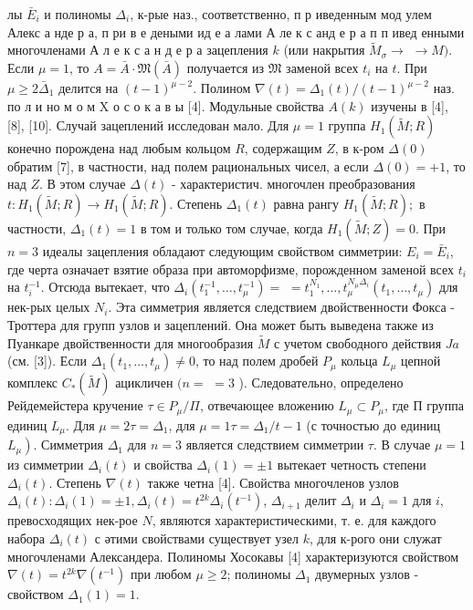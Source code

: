 \documentclass[10pt]{article}
\begin{document}
лы $\bar{E}_{i}$ и полиномы $\Delta_{i}$, к-рые наз., соответственно, п р иведенным мод улем Алекс а нде р а, п ри в е деными ид е а лами А ле к с анд е р а п п ивед енными многочленами А л е к с а н д е р а зацепления $k$ (или накрытия $\tilde{M}_{\sigma} \rightarrow$ $\rightarrow M)$. Если $\mu=1$, то $A=\bar{A} \cdot \mathfrak{M}(\bar{A})$ получается из $\mathfrak{M}$ заменой всех $t_{i}$ на $t$. При $\mu \geqslant 2 \bar{\Delta}_{1}$ делится на $(t-1)^{\mu-2}$. Полином $\nabla(t)=\Delta_{1}(t) /(t-1)^{\mu-2}$ наз. по л и но м о м $\mathrm{X}$ о с о к а в ы [4]. Модульные свойства $A(k)$ изучены в [4], [8], [10]. Случай зацеплений исследован мало. Для $\mu=1$ группа $H_{1}(\tilde{M} ; R)$ конечно порождена над любым кольцом $R$, содержащим $Z$, в к-ром $\Delta(0)$ обратим [7], в частности, над полем рациональных чисел, а если $\Delta(0)=+1$, то над $Z$. В этом случае $\Delta(t)$ - характеристич. многочлен преобразования $t: H_{1}(\tilde{M} ; R) \rightarrow H_{1}(\tilde{M} ; R)$. Степень $\Delta_{1}(t)$ равна рангу $H_{1}(\tilde{M} ; R) ;$ в частности, $\Delta_{1}(t)=1$ в том и только том случае, когда $H_{1}(\tilde{M} ; Z)=0$. При $n=3$ идеалы зацепления обладают следующим свойством симметрии: $E_{i}=\bar{E}_{i}$, где черта означает взятие образа при автоморфизме, порожденном заменой всех $t_{i}$ на $t_{i}^{-1}$. Отсюда вытекает, что $\Delta_{i}\left(t_{1}^{-1}, \ldots, t_{\mu}^{-1}\right)=$ $=t_{1}^{N_{1}}, \ldots, t_{\mu}^{N_{\mu} \Delta_{i}}\left(t_{1}, \ldots, t_{\mu}\right)$ для нек-рых целых $N_{i}$. Эта симметрия является следствием двойственности Фокса - Троттера для групп узлов и зацеплений. Она может быть выведена также из Пуанкаре двойственности для многообразия $\tilde{M}$ с учетом свободного действия $J a$ (см. [3]). Если $\Delta_{1}\left(t_{1}, \ldots, t_{\mu}\right) \neq 0$, то над полем дробей $P_{\mu}$ кольца $L_{\mu}$ цепной комплекс $C_{*}(\tilde{M})$ ацикличен $(n=$ $=3$ ). Следовательно, определено Рейдемейстера кручение $\tau \in P_{\mu} / \Pi$, отвечающее вложению $L_{\mu} \subset P_{\mu}$, где П группа единиц $L_{\mu}$. Для $\mu=2 \tau=\Delta_{1}$, для $\mu=1 \tau=\Delta_{1} / t-1$ (с точностью до единиц $\left.L_{\mu}\right)$. Симметрия $\Delta_{1}$ для $n=3$ является следствием симметрии $\tau$. В случае $\mu=1$ из симметрии $\Delta_{i}(t)$ и свойства $\Delta_{i}(1)= \pm 1$ вытекает четность степени $\Delta_{i}(t)$. Степень $\nabla(t)$ также четна [4]. Свойства многочленов узлов $\Delta_{i}(t): \Delta_{i}(1)= \pm 1, \Delta_{i}(t)=t^{2 k} \Delta_{i}\left(t^{-1}\right)$, $\Delta_{i+1}$ делит $\Delta_{i}$ и $\Delta_{i}=1$ для $i$, превосходящих нек-рое $N$, являются характеристическими, т. е. для каждого набора $\Delta_{i}(t)$ с әтими свойствами существует узел $k$, для к-рого они служат многочленами Александера. Полиномы Хосокавы [4] характеризуются свойством $\nabla(t)=t^{2 k} \nabla\left(t^{-1}\right)$ при любом $\mu \geqslant 2$; полиномы $\Delta_{1}$ двумерных узлов - свойством $\Delta_{1}(1)=1$.
\end{document}
